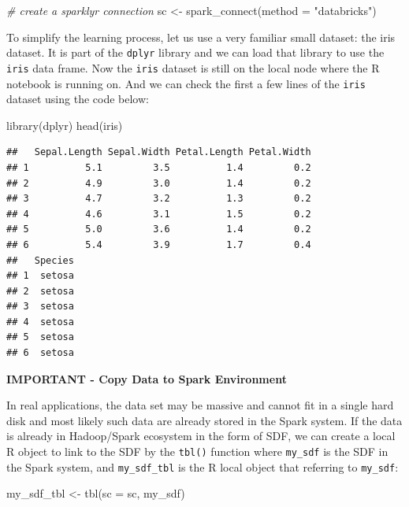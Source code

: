 \documentclass[
  12pt,
]{krantz}
\makeatletter
\newenvironment{Shaded}{\begin{snugshade}}{\end{snugshade}}
\newcommand{\AttributeTok}[1]{\textcolor[rgb]{0.61,0.61,0.61}{#1}}
\newcommand{\CommentTok}[1]{\textcolor[rgb]{0.37,0.37,0.37}{\textit{#1}}}
\newcommand{\FunctionTok}[1]{\textcolor[rgb]{0,0,0}{#1}}
\newcommand{\NormalTok}[1]{#1}
\newcommand{\OtherTok}[1]{\textcolor[rgb]{0.37,0.37,0.37}{#1}}
\newcommand{\StringTok}[1]{\textcolor[rgb]{0.5,0.5,0.5}{#1}}
\newenvironment{kframe}{%
\medskip{}
\setlength{\fboxsep}{.8em}
 \def\at@end@of@kframe{}%
 \ifinner\ifhmode%
  \def\at@end@of@kframe{\end{minipage}}%
  \begin{minipage}{\columnwidth}%
 \fi\fi%
 \def\FrameCommand##1{\hskip\@totalleftmargin \hskip-\fboxsep
 \colorbox{shadecolor}{##1}\hskip-\fboxsep
     \hskip-\linewidth \hskip-\@totalleftmargin \hskip\columnwidth}%
 \MakeFramed {\advance\hsize-\width
   \@totalleftmargin\z@ \linewidth\hsize
   \@setminipage}}%
 {\par\unskip\endMakeFramed%
 \at@end@of@kframe}
\renewenvironment{Shaded}{\begin{kframe}}{\end{kframe}}
\makeatother
\begin{document}
\begin{Shaded}
\begin{Highlighting}[]
\CommentTok{\# create a sparklyr connection}
\NormalTok{sc }\OtherTok{\textless{}{-}} \FunctionTok{spark\_connect}\NormalTok{(}\AttributeTok{method =} \StringTok{"databricks"}\NormalTok{)}
\end{Highlighting}
\end{Shaded}

To simplify the learning process, let us use a very familiar small dataset: the iris dataset. It is part of the \texttt{dplyr} library and we can load that library to use the \texttt{iris} data frame. Now the \texttt{iris} dataset is still on the local node where the R notebook is running on. And we can check the first a few lines of the \texttt{iris} dataset using the code below:

\begin{Shaded}
\begin{Highlighting}[]
\FunctionTok{library}\NormalTok{(dplyr)}
\FunctionTok{head}\NormalTok{(iris)}
\end{Highlighting}
\end{Shaded}

\begin{verbatim}
##   Sepal.Length Sepal.Width Petal.Length Petal.Width
## 1          5.1         3.5          1.4         0.2
## 2          4.9         3.0          1.4         0.2
## 3          4.7         3.2          1.3         0.2
## 4          4.6         3.1          1.5         0.2
## 5          5.0         3.6          1.4         0.2
## 6          5.4         3.9          1.7         0.4
##   Species
## 1  setosa
## 2  setosa
## 3  setosa
## 4  setosa
## 5  setosa
## 6  setosa
\end{verbatim}

\textbf{IMPORTANT - Copy Data to Spark Environment}

In real applications, the data set may be massive and cannot fit in a single hard disk and most likely such data are already stored in the Spark system. If the data is already in Hadoop/Spark ecosystem in the form of SDF, we can create a local R object to link to the SDF by the \texttt{tbl()} function where \texttt{my\_sdf} is the SDF in the Spark system, and \texttt{my\_sdf\_tbl} is the R local object that referring to \texttt{my\_sdf}:

\begin{Shaded}
\begin{Highlighting}[]
\NormalTok{my\_sdf\_tbl }\OtherTok{\textless{}{-}} \FunctionTok{tbl}\NormalTok{(}\AttributeTok{sc =}\NormalTok{ sc, my\_sdf)}
\end{Highlighting}
\end{Shaded}
\end{document}
